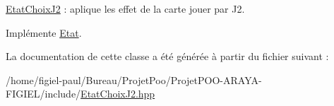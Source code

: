 \hyperlink{class_etat_choix_j2}{Etat\-Choix\-J2} \-: aplique les effet de la carte jouer par J2. 



Implémente \hyperlink{class_etat_aaf949c7b45217b76ff68414e61ef0d2a}{Etat}.



La documentation de cette classe a été générée à partir du fichier suivant \-:\begin{DoxyCompactItemize}
\item 
/home/figiel-\/paul/\-Bureau/\-Projet\-Poo/\-Projet\-P\-O\-O-\/\-A\-R\-A\-Y\-A-\/\-F\-I\-G\-I\-E\-L/include/\hyperlink{_etat_choix_j2_8hpp}{Etat\-Choix\-J2.\-hpp}\end{DoxyCompactItemize}
